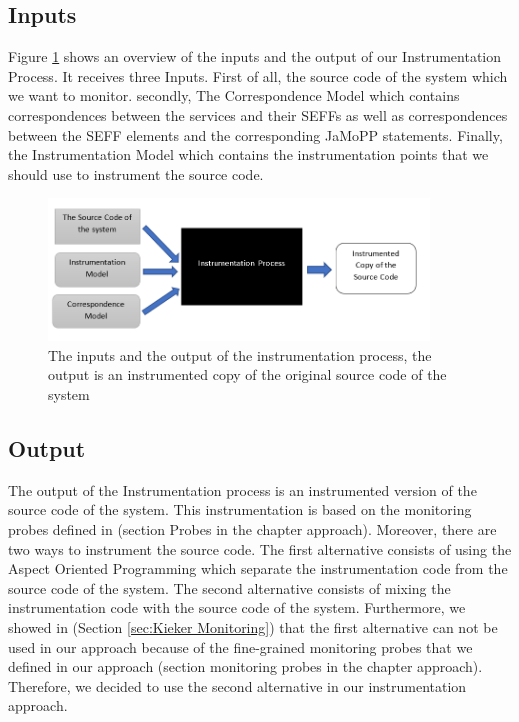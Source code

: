 \subsection{Inputs}
\label{sec:Inputs}
Figure \ref{fig:approach_design} shows an overview of the inputs and the output of our Instrumentation Process. It receives three Inputs. First of all, the source code of the system which we want to monitor. secondly, The Correspondence Model which contains correspondences between the services and their SEFFs as well as correspondences between the SEFF elements and the corresponding JaMoPP statements. Finally, the Instrumentation Model which contains the instrumentation points that we should use to instrument the source code. 

\begin{figure}[h]
\centering
\includegraphics[width=0.9\textwidth]{figures/approach_design}
\caption{The inputs and the output of the instrumentation process, the output is an instrumented copy of the original source code of the system}
\label{fig:approach_design}
\end{figure}

\subsection{Output}
\label{sec:output}

The output of the Instrumentation process is an instrumented version of the source code of the system.  This instrumentation is based on the monitoring probes defined in (section Probes in the chapter approach). Moreover, there are two ways to instrument the source code. The first alternative consists of using the Aspect Oriented Programming which separate the instrumentation code from the source code of the system. The second alternative consists of mixing the instrumentation code with the source code of the system. Furthermore, we showed in (Section \ref{sec:Kieker Monitoring}) that the first alternative can not be used in our approach because of the fine-grained monitoring probes that we defined in our approach (section monitoring probes in the chapter approach). Therefore, we decided to use the second alternative in our instrumentation approach.

